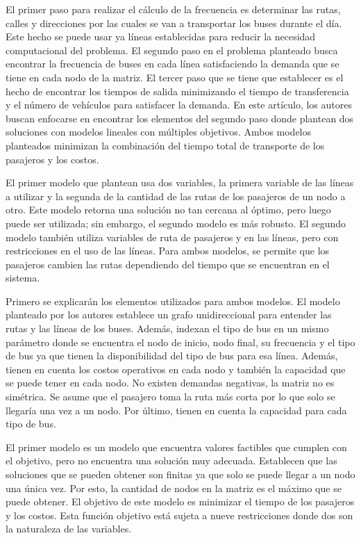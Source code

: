\documentclass[preprint,11pt]{elsarticle}
\begin{document}
El primer paso para realizar el cálculo de la frecuencia es determinar las rutas, calles y direcciones por las cuales se van a transportar los buses durante el día. Este hecho se puede usar ya líneas establecidas para reducir la necesidad computacional del problema. El segundo paso en el problema planteado busca encontrar la frecuencia de buses en cada línea satisfaciendo la demanda que se tiene en cada nodo de la matriz. El tercer paso que se tiene que establecer es el hecho de encontrar los tiempos de salida minimizando el tiempo de transferencia y el número de vehículos para satisfacer la demanda. En este artículo, los autores buscan enfocarse en encontrar los elementos del segundo paso donde plantean dos soluciones con modelos lineales con múltiples objetivos. Ambos modelos planteados minimizan la combinación del tiempo total de transporte de los pasajeros y los costos.

El primer modelo que plantean usa dos variables, la primera variable de las líneas a utilizar y la segunda de la cantidad de las rutas de los pasajeros de un nodo a otro. Este modelo retorna una solución no tan cercana al óptimo, pero luego puede ser utilizada; sin embargo, el segundo modelo es más robusto. El segundo modelo también utiliza variables de ruta de pasajeros y en las líneas, pero con restricciones en el uso de las líneas. Para ambos modelos, se permite que los pasajeros cambien las rutas dependiendo del tiempo que se encuentran en el sistema.

Primero se explicarán los elementos utilizados para ambos modelos. El modelo planteado por los autores establece un grafo unidireccional para entender las rutas y las líneas de los buses. Además, indexan el tipo de bus en un mismo parámetro donde se encuentra el nodo de inicio, nodo final, su frecuencia y el tipo de bus ya que tienen la disponibilidad del tipo de bus para esa línea. Además, tienen en cuenta los costos operativos en cada nodo y también la capacidad que se puede tener en cada nodo. No existen demandas negativas, la matriz no es simétrica. Se asume que el pasajero toma la ruta más corta por lo que solo se llegaría una vez a un nodo. Por último, tienen en cuenta la capacidad para cada tipo de bus.

El primer modelo es un modelo que encuentra valores factibles que cumplen con el objetivo, pero no encuentra una solución muy adecuada. Establecen que las soluciones que se pueden obtener son finitas ya que solo se puede llegar a un nodo una única vez. Por esto, la cantidad de nodos en la matriz es el máximo que se puede obtener. El objetivo de este modelo es minimizar el tiempo de los pasajeros y los costos. Esta función objetivo está sujeta a nueve restricciones donde dos son la naturaleza de las variables.
\end{document}
